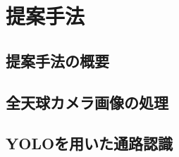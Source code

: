 \documentclass[../main]{subfiles}
\begin{document}
\setcounter{secnumdepth}{2}
    \chapter{提案手法}
        \section{提案手法の概要}
        \section{全天球カメラ画像の処理}
        \section{YOLOを用いた通路認識}
        \section{}
\end{document}

